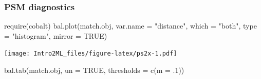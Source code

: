 \documentclass[
]{book}
\newenvironment{Shaded}{\begin{snugshade}}{\end{snugshade}}
\newcommand{\AttributeTok}[1]{\textcolor[rgb]{0.77,0.63,0.00}{#1}}
\newcommand{\ConstantTok}[1]{\textcolor[rgb]{0.00,0.00,0.00}{#1}}
\newcommand{\DecValTok}[1]{\textcolor[rgb]{0.00,0.00,0.81}{#1}}
\newcommand{\FunctionTok}[1]{\textcolor[rgb]{0.00,0.00,0.00}{#1}}
\newcommand{\NormalTok}[1]{#1}
\newcommand{\StringTok}[1]{\textcolor[rgb]{0.31,0.60,0.02}{#1}}
\begin{document}
\hypertarget{psm-diagnostics}{%
\subsubsection{PSM diagnostics}\label{psm-diagnostics}}

\begin{Shaded}
\begin{Highlighting}[]
\FunctionTok{require}\NormalTok{(cobalt)}
\FunctionTok{bal.plot}\NormalTok{(match.obj,  }
         \AttributeTok{var.name =} \StringTok{"distance"}\NormalTok{, }
         \AttributeTok{which =} \StringTok{"both"}\NormalTok{, }
         \AttributeTok{type =} \StringTok{"histogram"}\NormalTok{,  }
         \AttributeTok{mirror =} \ConstantTok{TRUE}\NormalTok{)}
\end{Highlighting}
\end{Shaded}

\texttt{[image: Intro2ML\_files/figure-latex/ps2x-1.pdf]}

\begin{Shaded}
\begin{Highlighting}[]
\FunctionTok{bal.tab}\NormalTok{(match.obj, }\AttributeTok{un =} \ConstantTok{TRUE}\NormalTok{, }
        \AttributeTok{thresholds =} \FunctionTok{c}\NormalTok{(}\AttributeTok{m =}\NormalTok{ .}\DecValTok{1}\NormalTok{))}
\end{Highlighting}
\end{Shaded}
\end{document}
